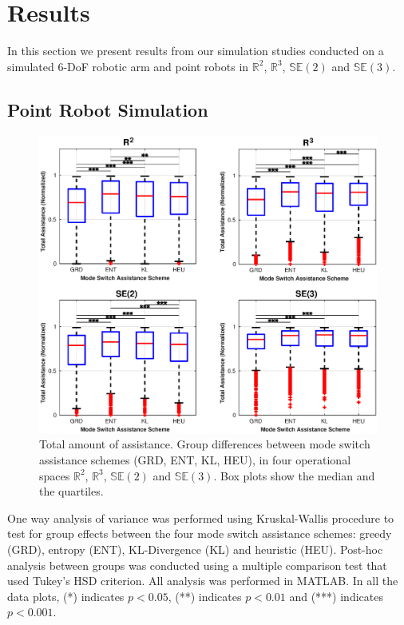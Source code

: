 \documentclass[conference]{IEEEtran}
\begin{document}
\section{Results}\label{sec:results}

In this section we present results from our simulation studies conducted on a simulated 6-DoF robotic arm and point robots in $\mathbb{R}^2$, $\mathbb{R}^3$, $\mathbb{SE}(2)$ and $\mathbb{SE}(3)$. 
\subsection{Point Robot Simulation}
\begin{figure}[t]
	\centering
	\includegraphics[width= 1.\hsize, height=0.5\vsize]{./figures/total_assistance.eps}
	\vspace{-0.8cm}
	\caption{Total amount of assistance. Group differences between mode switch assistance schemes (GRD, ENT, KL, HEU), in four operational spaces $\mathbb{R}^2$, $\mathbb{R}^3$, $\mathbb{SE}(2)$ and $\mathbb{SE}(3)$. Box plots show the median and the quartiles.} 
	\label{fig:total_assistance}
\end{figure}
One way analysis of variance was performed using Kruskal-Wallis procedure to test for group effects  between the four mode switch assistance schemes: greedy (GRD), entropy (ENT), KL-Divergence (KL) and heuristic (HEU). Post-hoc analysis between groups was conducted using a multiple comparison test that used Tukey's HSD criterion. All analysis was performed in MATLAB. In all the data plots, (*) indicates $p < 0.05$, (**) indicates $p < 0.01$ and (***) indicates $p < 0.001$.
\end{document}
